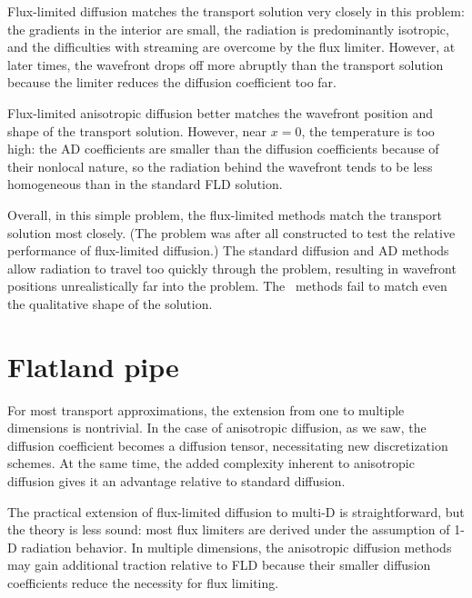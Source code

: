 Flux-limited diffusion matches the transport solution very closely in this
problem: the gradients in the interior are small, the radiation is predominantly
isotropic, and the difficulties with streaming are overcome by the flux limiter.
However, at later times, the wavefront drops off more abruptly than the
transport solution because the limiter reduces the diffusion coefficient too
far.

Flux-limited anisotropic diffusion better matches the wavefront position and
shape of the transport solution. However, near $x=0$, the temperature is too
high: the AD coefficients are smaller than the diffusion coefficients
because of their nonlocal nature, so the radiation behind the wavefront tends to
be less homogeneous than in the standard FLD solution.


Overall, in this simple problem, the flux-limited methods match the transport
solution most closely. (The problem was after all constructed to test the
relative performance of flux-limited diffusion.) The standard diffusion
and AD methods allow radiation to travel too quickly through the problem,
resulting in wavefront positions unrealistically far into the problem. The
\Pone\ methods fail to match even the qualitative shape of the solution.

\section{Flatland pipe}

For most transport approximations, the extension from one to multiple
dimensions is nontrivial. In the case of anisotropic diffusion, as we saw, the
diffusion coefficient becomes a diffusion tensor, necessitating new
discretization schemes. At the same time, the added complexity inherent
to anisotropic
diffusion gives it an advantage relative to standard diffusion.

The practical extension of flux-limited diffusion to multi-D is straightforward,
but the theory is less sound: most flux limiters are derived under
the assumption of 1-D radiation behavior. In multiple dimensions, the
anisotropic diffusion methods may gain additional traction relative to FLD
because their smaller diffusion coefficients reduce the necessity for flux
limiting.

